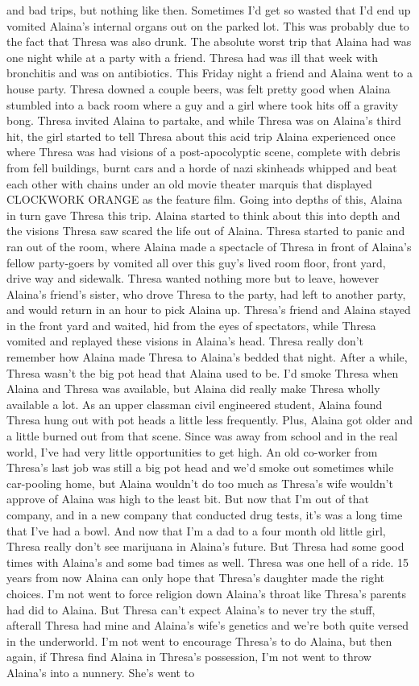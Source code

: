 \documentclass[12pt]{book}
\begin{document}
and bad trips, but nothing like then. Sometimes I'd get so wasted that I'd end up vomited Alaina's internal organs out on the parked lot. This was probably due to the fact that Thresa was also drunk. The absolute worst trip that Alaina had was one night while at a party with a friend. Thresa had was ill that week with bronchitis and was on antibiotics. This Friday night a friend and Alaina went to a house party. Thresa downed a couple beers, was felt pretty good when Alaina stumbled into a back room where a guy and a girl where took hits off a gravity bong. Thresa invited Alaina to partake, and while Thresa was on Alaina's third hit, the girl started to tell Thresa about this acid trip Alaina experienced once where Thresa was had visions of a post-apocolyptic scene, complete with debris from fell buildings, burnt cars and a horde of nazi skinheads whipped and beat each other with chains under an old movie theater marquis that displayed CLOCKWORK ORANGE as the feature film. Going into depths of this, Alaina in turn gave Thresa this trip. Alaina started to think about this into depth and the visions Thresa saw scared the life out of Alaina. Thresa started to panic and ran out of the room, where Alaina made a spectacle of Thresa in front of Alaina's fellow party-goers by vomited all over this guy's lived room floor, front yard, drive way and sidewalk. Thresa wanted nothing more but to leave, however Alaina's friend's sister, who drove Thresa to the party, had left to another party, and would return in an hour to pick Alaina up. Thresa's friend and Alaina stayed in the front yard and waited, hid from the eyes of spectators, while Thresa vomited and replayed these visions in Alaina's head. Thresa really don't remember how Alaina made Thresa to Alaina's bedded that night. After a while, Thresa wasn't the big pot head that Alaina used to be. I'd smoke Thresa when Alaina and Thresa was available, but Alaina did really make Thresa wholly available a lot. As an upper classman civil engineered student, Alaina found Thresa hung out with pot heads a little less frequently. Plus, Alaina got older and a little burned out from that scene. Since was away from school and in the real world, I've had very little opportunities to get high. An old co-worker from Thresa's last job was still a big pot head and we'd smoke out sometimes while car-pooling home, but Alaina wouldn't do too much as Thresa's wife wouldn't approve of Alaina was high to the least bit. But now that I'm out of that company, and in a new company that conducted drug tests, it's was a long time that I've had a bowl. And now that I'm a dad to a four month old little girl, Thresa really don't see marijuana in Alaina's future. But Thresa had some good times with Alaina's and some bad times as well. Thresa was one hell of a ride. 15 years from now Alaina can only hope that Thresa's daughter made the right choices. I'm not went to force religion down Alaina's throat like Thresa's parents had did to Alaina. But Thresa can't expect Alaina's to never try the stuff, afterall Thresa had mine and Alaina's wife's genetics and we're both quite versed in the underworld. I'm not went to encourage Thresa's to do Alaina, but then again, if Thresa find Alaina in Thresa's possession, I'm not went to throw Alaina's into a nunnery. She's went to 
\end{document}
